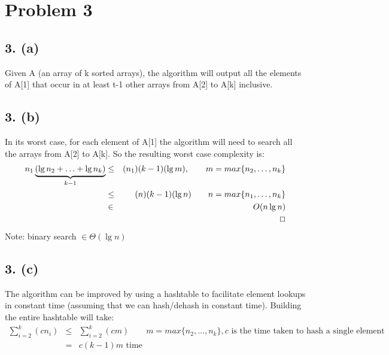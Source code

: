 \documentclass{article}[12pt]
\begin{document}
\section*{Problem 3}

\subsection*{3. (a)}

  Given A (an array of k sorted arrays), the algorithm will output all the elements of A[1] that occur in at least t-1 other arrays from A[2] to A[k] inclusive.

\subsection*{3. (b)}
  In its worst case, for each element of A[1] the algorithm will need to search all the arrays from A[2] to A[k]. So the resulting worst case complexity is:
  \begin{eqnarray*}
    n_{1}\underbrace{(\lg n_{2} + \ldots + \lg n_{k})}_{k-1} & \leq & (n_{1})(k-1)(\lg m), \qquad m = max\{n_{2}, \ldots, n_{k}\} \\
    & \leq & (n)(k-1)(\lg n) \qquad n = max\{n_{1}, \ldots, n_{k}\} \\
    & \in & O(n\lg n) \\
    & & \indent \indent \indent \Box \\
  \end{eqnarray*}
  Note: binary search $\in \Theta(\lg n)$ \\


\newpage

\subsection*{3. (c)}
  The algorithm can be improved by using a hashtable to facilitate element lookups in constant time (assuming that we can hash/dehash in constant time). Building the entire hashtable will take:
  \begin{eqnarray*}
    \sum_{i=2}^k(cn_{i}) & \leq & \sum_{i=2}^k(cm) \qquad m = max\{n_{2}, \ldots, n_{k}\}, c \textrm{ is the time taken to hash a single element} \\
    & = & c(k-1)m \textrm{ time} \\
  \end{eqnarray*}
\end{document}
